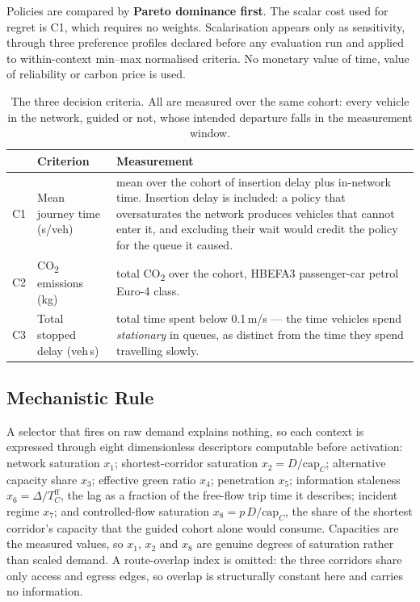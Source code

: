 \documentclass[runningheads]{llncs}
\newcommand{\CO}{CO\textsubscript{2}}
\begin{document}
Policies are compared by \textbf{Pareto dominance first}. The scalar cost used
for regret is C1, which requires no weights. Scalarisation appears only as
sensitivity, through three preference profiles declared before any evaluation
run and applied to within-context min--max normalised criteria. No monetary
value of time, value of reliability or carbon price is used.

\begin{table}[t]
\caption{The three decision criteria. All are measured over the same cohort:
every vehicle in the network, guided or not, whose intended departure falls in
the measurement window.}
\label{tab:criteria}
\centering\footnotesize
\begin{tabularx}{\textwidth}{@{}l l X@{}}
\toprule
& Criterion & Measurement\\
\midrule
C1 & Mean journey time (s/veh) &
  mean over the cohort of insertion delay plus in-network time. Insertion delay
  is included: a policy that oversaturates the network produces vehicles that
  cannot enter it, and excluding their wait would credit the policy for the
  queue it caused.\\[2pt]
C2 & \CO{} emissions (kg) &
  total \CO{} over the cohort, HBEFA3 passenger-car petrol Euro-4 class.\\[2pt]
C3 & Total stopped delay (veh\,s) &
  total time spent below 0.1\,m/s --- the time vehicles spend \emph{stationary}
  in queues, as distinct from the time they spend travelling slowly.\\
\bottomrule
\end{tabularx}
\end{table}
\subsection{Mechanistic Rule}

A selector that fires on raw demand explains nothing, so each context is
expressed through eight dimensionless descriptors computable before activation:
network saturation $x_1$; shortest-corridor saturation
$x_2 = D/\mathrm{cap}_C$; alternative capacity share $x_3$; effective green
ratio $x_4$; penetration $x_5$; information staleness
$x_6 = \Delta/T^{\mathrm{ff}}_C$, the lag as a fraction of the free-flow trip
time it describes; incident regime $x_7$; and controlled-flow saturation
$x_8 = p\,D/\mathrm{cap}_C$, the share of the shortest corridor's capacity that
the guided cohort alone would consume. Capacities are the measured values, so
$x_1$, $x_2$ and $x_8$ are genuine degrees of saturation rather than scaled
demand. A route-overlap index is omitted: the three corridors share only access
and egress edges, so overlap is structurally constant here and carries no
information.
\end{document}
